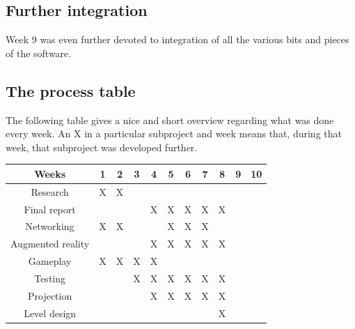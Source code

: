       \subsection{Further integration}
      Week 9 was even further devoted to integration of all the various bits and
      pieces of the software. 
      
      \subsection{The process table} \label{ssec:processtable}
      The following table gives a nice and short overview regarding what was done
      every week. An X in a particular subproject and week means that, during that
      week, that subproject was developed further.\\
      \begin{table}[!ht]
	      \begin{tabular}{| c | c | c | c | c | c | c | c | c | c | c |}
	      	      \hline
	      	      Weeks & 1 & 2 & 3 & 4 & 5 & 6 & 7 & 8 & 9 & 10 \\
	      	      \hline
	      	      Research & X & X & \space & \space & \space & \space & \space & \space & \space & \space \\
	      	      \hline
	      	      Final report & \space & \space & \space & X & X & X & X & X & \space & \space \\
	      	      \hline
	      	      Networking & X & X & \space & \space & X & X & X & \space & \space & \space \\
	      	      \hline
	      	      Augmented reality & \space & \space & \space & X & X & X & X & X & \space & \space \\
	      	      \hline
	      	      Gameplay & X & X & X & X & \space & \space & \space & \space & \space & \space \\
	      	      \hline
	      	      Testing & \space & \space & X & X & X & X & X & X & \space & \space \\
	      	      \hline
	      	      Projection & \space & \space & \space & X & X & X & X & X & \space & \space \\
		      	  \hline
		      	  Level design & \space & \space & \space & \space & \space & \space & \space & X & \space & \space \\
		      	  \hline
	      \end{tabular}
      \end{table}

